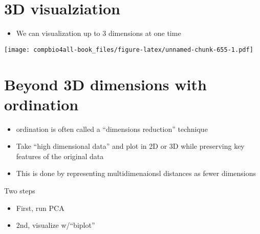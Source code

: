 \documentclass[
]{book}
\newenvironment{Shaded}{\begin{snugshade}}{\end{snugshade}}
\newcommand{\CommentTok}[1]{\textcolor[rgb]{0.56,0.35,0.01}{\textit{#1}}}
\newcommand{\FunctionTok}[1]{\textcolor[rgb]{0.00,0.00,0.00}{#1}}
\newcommand{\NormalTok}[1]{#1}
\newcommand{\SpecialCharTok}[1]{\textcolor[rgb]{0.00,0.00,0.00}{#1}}
\providecommand{\tightlist}{%
  \setlength{\itemsep}{0pt}\setlength{\parskip}{0pt}}
\begin{document}
\hypertarget{d-visualziation}{%
\section{3D visualziation}\label{d-visualziation}}

\begin{itemize}
\tightlist
\item
  We can visualization up to 3 dimensions at one time
\end{itemize}

\begin{Shaded}
\end{Shaded}

\texttt{[image: compbio4all-book\_files/figure-latex/unnamed-chunk-655-1.pdf]}

\hypertarget{beyond-3d-dimensions-with-ordination}{%
\section{Beyond 3D dimensions with ordination}\label{beyond-3d-dimensions-with-ordination}}

\begin{itemize}
\tightlist
\item
  ordination is often called a ``dimensions reduction'' technique
\item
  Take ``high dimensional data'' and plot in 2D or 3D while preserving key features of the original data
\item
  This is done by representing multidimenaionsl distances as fewer dimensions
\end{itemize}

Two steps

\begin{itemize}
\tightlist
\item
  First, run PCA
\item
  2nd, visualize w/``biplot''
\end{itemize}
\end{document}
